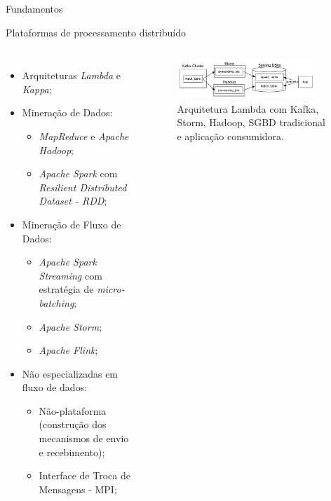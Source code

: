 \documentclass[aspectratio=1610,10pt]{beamer}
\begin{document}
\begin{frame}[fragile]{Fundamentos}
  \begin{alertblock}{Plataformas de processamento distribuído}
    \vspace{5mm}
    \begin{columns}[T,onlytextwidth]
        \begin{itemize}%
          \item Arquiteturas \emph{Lambda} e \emph{Kappa};
          \item Mineração de Dados:
          \begin{itemize}
            \item \emph{MapReduce} e \emph{Apache Hadoop};
            \item \emph{Apache Spark} com \emph{Resilient Distributed Dataset - RDD};
          \end{itemize}
          \item Mineração de Fluxo de Dados:
          \begin{itemize}
            \item \emph{Apache Spark Streaming} com estratégia de \emph{micro-batching};
            \item \emph{Apache Storm};
            \item \emph{Apache Flink};
          \end{itemize}
          \item Não especializadas em fluxo de dados:
          \begin{itemize}
            \item Não-plataforma (construção dos mecanismos de envio e recebimento);
            \item Interface de Troca de Mensagens - MPI;
          \end{itemize}
        \end{itemize}
        \begin{figure}
            \includegraphics[width=0.9\textwidth]{figuras/lambda.png}
            \caption{Arquitetura Lambda com Kafka, Storm, Hadoop, SGBD tradicional e aplicação consumidora.}

\end{figure}
\end{columns}
\end{alertblock}
\end{frame}
\end{document}
